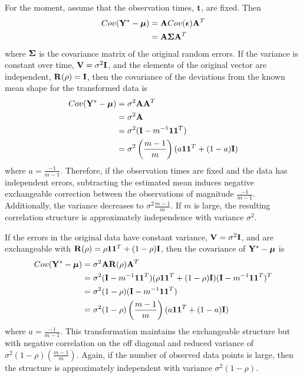 For the moment, assume that the observation times, $\mathbf t$, are fixed. Then
\begin{align*}
Cov(\mathbf Y^{*} - \boldsymbol\mu)&= \mathbf ACov(\boldsymbol\epsilon)\mathbf A^{T}\\
&= \mathbf A\boldsymbol\Sigma \mathbf A^{T}
\end{align*}
where $\boldsymbol\Sigma$ is the covariance matrix of the original random errors. If the variance is constant over time, $\mathbf V=\sigma^{2}\mathbf I$, and the elements of the original vector are independent, $\mathbf R(\rho)=\mathbf I$, then the covariance of the deviations from the known mean shape for the transformed data is
\begin{align*} 
Cov(\mathbf Y^{*}- \boldsymbol\mu) &= \sigma^{2}\mathbf A\mathbf A^{T} \\
&=\sigma^{2}\mathbf A\\
&= \sigma^{2}(\mathbf I - m^{-1}\mathbf1\mathbf1^{T})\\
&=\sigma^{2}\left(\frac{m-1}{m}\right)(a\mathbf 1\mathbf 1^{T}+ (1-a)\mathbf I)
\end{align*}
 where $a=\frac{-1}{m-1}$. Therefore, if the observation times are fixed and the data has independent errors, subtracting the estimated mean induces negative exchangeable correction between the observations of magnitude $\frac{-1}{m-1}$. Additionally, the variance decreases to $\sigma^{2}\frac{m-1}{m}$. If $m$ is large, the resulting correlation structure is approximately independence with variance $\sigma^{2}$.
 
 If the errors in the original data have constant variance, $\mathbf V=\sigma^{2}\mathbf I$, and are exchangeable with $\mathbf R(\rho) = \rho\mathbf 1 \mathbf 1^{T} + (1-\rho)\mathbf I$, then the covariance of $\mathbf Y^{*} - \boldsymbol\mu$ is
 \begin{align*}
 Cov(\mathbf Y^{*}- \boldsymbol\mu) &= \sigma^{2}\mathbf A\mathbf R(\rho)\mathbf A^{T}\\
 &= \sigma^{2}(\mathbf I-m^{-1}\mathbf1\mathbf1^{T})(\rho\mathbf1\mathbf1^{T}+(1-\rho)\mathbf I)(\mathbf I-m^{-1}\mathbf1\mathbf1^{T})^{T}\\
 &= \sigma^{2}(1-\rho)(\mathbf I-m^{-1}\mathbf1\mathbf1^{T})\\
 &=\sigma^{2}(1-\rho)\left(\frac{m-1}{m}\right)(a\mathbf 1\mathbf 1^{T}+ (1-a)\mathbf I)
 \end{align*} 
 where $a=\frac{-1}{m-1}$. This transformation maintains the exchangeable structure but with negative correlation on the off diagonal and reduced variance of $\sigma^{2}(1-\rho)\left(\frac{m-1}{m}\right)$.  Again, if the number of observed data points is large, then the structure is approximately independent with variance $\sigma^{2}(1-\rho)$.

